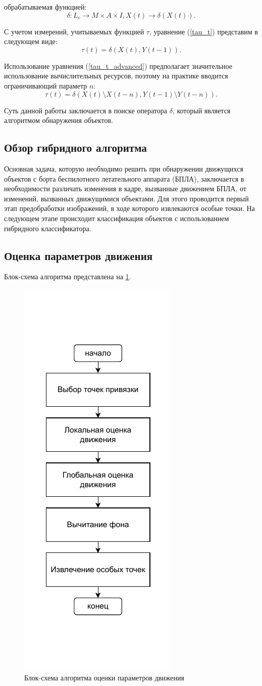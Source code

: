 обрабатываемая функцией:
\begin{equation}
\delta : L_c \rightarrow M \times A \times I, X(t) \rightarrow \delta(X(t)).
\end{equation}

С учетом измерений, учитываемых функцией $\tau$, уравнение (\ref{tau_t}) представим в следующем виде:
\begin{equation}
\label{tau_t_advanced}
\tau(t) = \delta(X(t), Y(t - 1)).
\end{equation}

Использование уравнения (\ref{tau_t_advanced}) предполагает значительное использование вычислительных ресурсов, поэтому на практике вводится ограничивающий параметр $n$:
\begin{equation}
\tau(t) = \delta(X(t) \setminus X(t - n), Y(t - 1) \setminus Y(t - n)).
\end{equation}

Суть данной работы заключается в поиске оператора $\delta$, который является алгоритмом обнаружения объектов.
\subsection{Обзор гибридного алгоритма}
Основная задача, которую необходимо решить при обнаружении движущихся объектов с борта беспилотного летательного аппарата (БПЛА), заключается в необходимости различать изменения в кадре, вызванные движением БПЛА, от изменений, вызванных движущимися объектами. Для этого проводится первый этап предобработки изображений, в ходе которого извлекаются особые точки. На следующем этапе происходит классификация объектов с использованием гибридного классификатора.
\subsection{Оценка параметров движения}
Блок-схема алгоритма представлена на \ref{fig:dvizh}.
  \begin{figure}[ht!]
    \centering
    \includegraphics[width=0.3\linewidth]{my_folder/images/движение.pdf}
    \caption{Блок-схема алгоритма оценки параметров движения}
    \label{fig:dvizh}
\end{figure}

